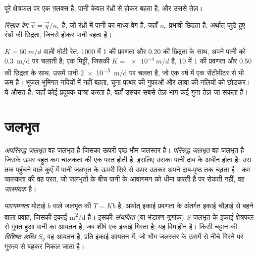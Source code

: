  पूरे क्षेत्रफल पर एक फ़्लक्स है; पानी
केवल रंध्रों से होकर बहता है, और उससे तेज़।

\begin{definition}[रिसाव वेग]\label{def:b3:hydrogeology:seepage}
\emph{रिसाव वेग} $\vec v = \vec
q/n_e$ है, जो रंध्रों में पानी का माध्य वेग है, जहाँ $n_e$
प्रभावी छिद्रता है, अर्थात् जुड़े हुए रंध्रों की छिद्रता, जिनसे होकर
पानी बहता है।
\end{definition}

$K = \qty{60}{m/d}$ वाली मोटी रेत, 1000 में 1 की प्रवणता और 0.20 की छिद्रता के साथ,
अपने पानी को \qty{0.3}{m/d} पर चलाती है; एक मिट्टी, जिसकी $K =
\qty{e-4}{m/d}$ है, 10 में 1 की प्रवणता और 0.50 की छिद्रता के साथ,
उसमें पानी \qty{2e-5}{m/d} पर चलता है, जो एक वर्ष में एक सेंटीमीटर से भी कम है। भूजल
भूमिगत नदियों में नहीं बहता, चूना-पत्थर की गुफाओं और लावा की
नलियों को छोड़कर। ये औसत हैं: जहाँ कोई प्रदूषक यात्रा करता है, वहाँ उसका सबसे तेज़ भाग
कई गुना तेज़ जा सकता है।

\section{जलभृत}\label{sec:b3:hydrogeology:aquifers}

\begin{definition}\label{def:b3:hydrogeology:aquifer-types}
\emph{अपरिरुद्ध जलभृत} वह जलभृत है जिसका
ऊपरी पृष्ठ भौम जलस्तर है। \emph{परिरुद्ध
जलभृत} वह जलभृत है जिसके ऊपर बहुत कम चालकता की एक परत होती है,
इसलिए उसका पानी दाब के अधीन होता है: उस तक पहुँचने वाले कुएँ में पानी
जलभृत के ऊपरी सिरे से ऊपर उठकर अपने दाब-पृष्ठ तक चढ़ता है।
कम चालकता की वह परत, जो जलभृतों के बीच पानी के आवागमन को धीमा करती है
पर रोकती नहीं, वह
\emph{जलमंदक} है।
\end{definition}

\begin{definition}[पारगमनता; संचयिता; विशिष्ट लब्धि]\label{def:b3:hydrogeology:storage}
\emph{पारगमनता} मोटाई $b$ वाले जलभृत की
$T = Kb$ है, अर्थात् इकाई प्रवणता के अंतर्गत इकाई चौड़ाई से बहने वाला प्रवाह, जिसकी इकाई
\unit{m^2/d} है। इसकी \emph{संचयिता} (या भंडारण गुणांक) $S$
जलभृत के इकाई क्षेत्रफल से मुक्त हुआ पानी का आयतन है, जब शीर्ष एक इकाई गिरता है;
यह विमाहीन है। किसी चट्टान की \emph{विशिष्ट लब्धि}
$S_y$ वह आयतन है, प्रति इकाई आयतन में, जो
भौम जलस्तर के उसमें से नीचे गिरने पर
गुरुत्व से बहकर निकल जाता है।
\end{definition}

